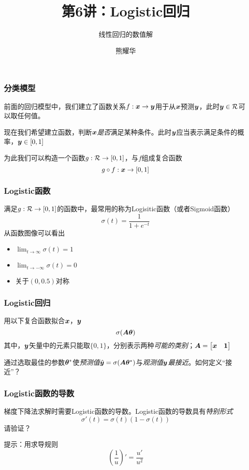 \documentclass[14pt]{beamer}
\title{第6讲：Logistic回归}
\subtitle{线性回归的数值解}
\author{熊耀华}
\institute{交通工程系}
\begin{document}
\begin{frame}
    \titlepage
\end{frame}

\begin{frame}
  \frametitle{分类模型}
  前面的回归模型中，我们建立了函数关系$f:\bm{x}\to\bm{y}$用于从$\bm{x}$预测$\bm{y}$，此时$\bm{y}\in \mathcal{R}$可以取任何值。

  现在我们希望建立函数，判断$\bm{x}$\emph{是否}满足某种条件。此时$\bm{y}$应当表示满足条件的概率，$\bm{y}\in[0,1]$

  为此我们可以构造一个函数$g:\mathcal{R}\to[0,1]$，与$f$组成复合函数
  \begin{equation}
    g\circ f:\bm{x}\to[0,1]
  \end{equation}
\end{frame}

\begin{frame}
  \frametitle{Logistic函数}
  满足$g:\mathcal{R}\to[0,1]$的函数中，最常用的称为Logisitic函数（或者Sigmoid函数）
  \begin{equation}
    \sigma(t)=\frac{1}{1+e^{-t}}
  \end{equation}
  从函数图像可以看出
  \begin{itemize}
    \item $\lim_{t\to\infty}\sigma(t)=1$
    \item $\lim_{t\to-\infty}\sigma(t)=0$
    \item 关于$(0, 0.5)$对称
  \end{itemize}
  

\end{frame}
\begin{frame}
  \frametitle{Logistic回归}
  用以下复合函数拟合$\bm{x}$，$\bm{y}$
  \begin{equation}
    \sigma(\bm{A}\bm{\theta})
  \end{equation}
  其中，$\bm{y}$矢量中的元素只能取$\{0,1\}$，分别表示两种\emph{可能的类别}；$\bm{A}=\begin{bmatrix}
    \bm{x} & \bm{1}
  \end{bmatrix}$

  通过选取最佳的参数$\bm{\theta}^*$使\emph{预测值}$\hat{\bm{y}}=\sigma(\bm{A}\bm{\theta}^*)$与\emph{观测值}$\bm{y}$\emph{最接近}。如何定义“接近”？
\end{frame}

\begin{frame}
  \frametitle{Logistic函数的导数}
  梯度下降法求解时需要Logistic函数的导数。Logistic函数的导数具有\emph{特别形式}
  \begin{equation}
    \sigma'(t)=\sigma(t)(1-\sigma(t))
  \end{equation}
  请验证？
  
  提示：用求导规则
  $$\left(\frac{1}{u}\right)'=\frac{u'}{u^2}$$
\end{frame}
\end{document}
